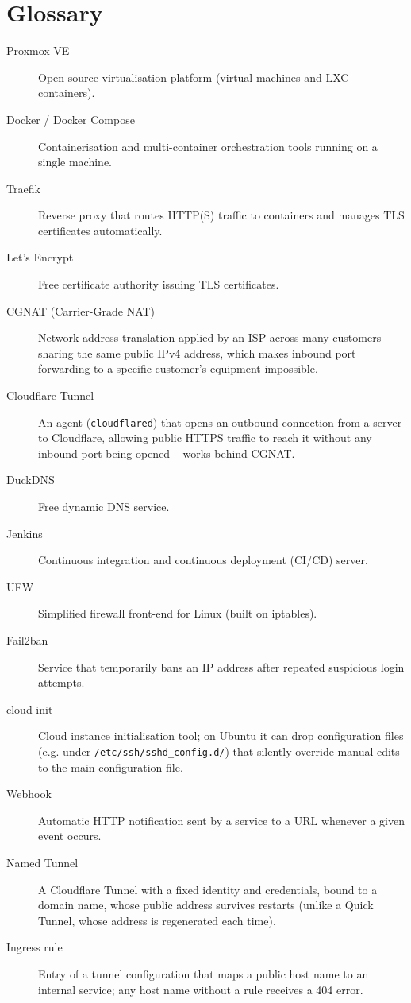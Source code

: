 \chapter{Glossary}
\label{annexe:glossaire}

\begin{description}
  \item[Proxmox VE] Open-source virtualisation platform (virtual machines and LXC containers).
  \item[Docker / Docker Compose] Containerisation and multi-container orchestration tools running on a single machine.
  \item[Traefik] Reverse proxy that routes HTTP(S) traffic to containers and manages TLS certificates automatically.
  \item[Let's Encrypt] Free certificate authority issuing TLS certificates.
  \item[CGNAT (Carrier-Grade NAT)] Network address translation applied by an ISP across many customers sharing the same public IPv4 address, which makes inbound port forwarding to a specific customer's equipment impossible.
  \item[Cloudflare Tunnel] An agent (\texttt{cloudflared}) that opens an outbound connection from a server to Cloudflare, allowing public HTTPS traffic to reach it without any inbound port being opened -- works behind CGNAT.
  \item[DuckDNS] Free dynamic DNS service.
  \item[Jenkins] Continuous integration and continuous deployment (CI/CD) server.
  \item[UFW] Simplified firewall front-end for Linux (built on iptables).
  \item[Fail2ban] Service that temporarily bans an IP address after repeated suspicious login attempts.
  \item[cloud-init] Cloud instance initialisation tool; on Ubuntu it can drop configuration files (e.g. under \texttt{/etc/ssh/sshd\_config.d/}) that silently override manual edits to the main configuration file.
  \item[Webhook] Automatic HTTP notification sent by a service to a URL whenever a given event occurs.
  \item[Named Tunnel] A Cloudflare Tunnel with a fixed identity and credentials, bound to a domain name, whose public address survives restarts (unlike a Quick Tunnel, whose address is regenerated each time).
  \item[Ingress rule] Entry of a tunnel configuration that maps a public host name to an internal service; any host name without a rule receives a 404 error.

\end{description}
